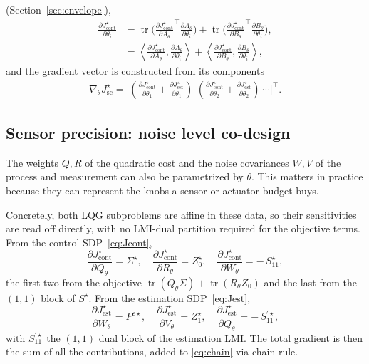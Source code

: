 \documentclass[twocolumn,amsthm]{autart}
\begin{document}
(Section~\ref{sec:envelope}),
\begin{align}\label{eq:chain}
\frac{\partial J_{\mathrm{cont}}^\star}{\partial \theta_i} &=
\operatorname{tr}\!\Big(\frac{\partial J_{\mathrm{cont}}^\star}{\partial A_\theta}^{\!\top}
\frac{\partial A_\theta}{\partial \theta_i}\Big)
+ \operatorname{tr}\!\Big(\frac{\partial J_{\mathrm{cont}}^\star}{\partial B_\theta}^{\!\top}
\frac{\partial B_\theta}{\partial \theta_i}\Big) ,\nonumber\\
&= \left \langle\frac{\partial J_{\mathrm{cont}}^\star}{\partial A_\theta},
\frac{\partial A_\theta}{\partial \theta_i}\right \rangle
+ \left \langle\frac{\partial J_{\mathrm{cont}}^\star}{\partial B_\theta},
\frac{\partial B_\theta}{\partial \theta_i}\right \rangle,
\end{align}
and the gradient vector is constructed from its components
\begin{align*}
    \nabla_\theta J_{\mathrm{sc}}^\star = \Big [\left(\frac{\partial J_{\mathrm{cont}}^\star}{\partial \theta_1} + \frac{\partial J_{\mathrm{est}}^\star}{\partial \theta_1}\right )\,\, \left (\frac{\partial J_{\mathrm{cont}}^\star}{\partial \theta_2} + \frac{\partial J_{\mathrm{est}}^\star}{\partial \theta_2} \right )\, \cdots  \Big]^\top.
\end{align*}


\subsection{Sensor precision: noise level co-design}\label{sec:weights}
The weights $Q, R$ of the quadratic cost and the noise covariances $W, V$ of the
process and measurement can also be parametrized by $\theta$. This matters in practice because they can represent the knobs a sensor or actuator budget buys.

Concretely, both LQG subproblems are affine in these data, so their sensitivities
are read off directly, with no LMI-dual partition required for the objective
terms. From the control SDP~\eqref{eq:Jcont},
\begin{equation}\label{eq:gradQRcont}
\frac{\partial J_{\mathrm{cont}}^\star}{\partial Q_\theta} = \Sigma^\star,\quad
\frac{\partial J_{\mathrm{cont}}^\star}{\partial R_\theta} = Z_0^\star,\quad
\frac{\partial J_{\mathrm{cont}}^\star}{\partial W_\theta} = -\,S_{11}^\star,
\end{equation}
the first two from the objective $\operatorname{tr}(Q_\theta\Sigma)+\operatorname{tr}(R_\theta Z_0)$ and the
last from the $(1,1)$ block of $S^\star$. From the estimation SDP~\eqref{eq:Jest},
\begin{equation}\label{eq:gradQRest}
\frac{\partial J_{\mathrm{est}}^\star}{\partial W_\theta} = P^{\varepsilon\star},\quad
\frac{\partial J_{\mathrm{est}}^\star}{\partial V_\theta} = Z_1^\star,\quad
\frac{\partial J_{\mathrm{est}}^\star}{\partial Q_\theta} = -\,S_{11}^{\prime\star},
\end{equation}
with $S_{11}^{\prime\star}$ the $(1,1)$ dual block of the estimation LMI. The total gradient is then the sum of all the contributions, added to \eqref{eq:chain} via chain rule.
\end{document}
